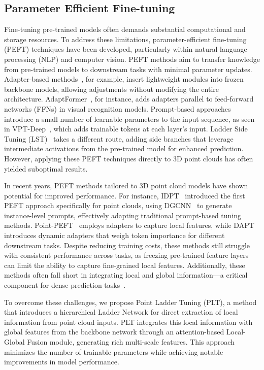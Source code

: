 \subsection{Parameter Efficient Fine-tuning}
Fine-tuning pre-trained models often demands substantial computational and storage resources. To address these limitations, parameter-efficient fine-tuning (PEFT) techniques have been developed, particularly within natural language processing (NLP) and computer vision. PEFT methods aim to transfer knowledge from pre-trained models to downstream tasks with minimal parameter updates. Adapter-based methods~\cite{houlsby2019parameter, hu2021lora, chen2022adaptformer}, for example, insert lightweight modules into frozen backbone models, allowing adjustments without modifying the entire architecture. AdaptFormer~\cite{chen2022adaptformer}, for instance, adds adapters parallel to feed-forward networks (FFNs) in visual recognition models. Prompt-based approaches~\cite{li2021prefix, jia2022visual} introduce a small number of learnable parameters to the input sequence, as seen in VPT-Deep~\cite{jia2022visual}, which adds trainable tokens at each layer’s input. Ladder Side Tuning (LST)~\cite{sung2022lst} takes a different route, adding side branches that leverage intermediate activations from the pre-trained model for enhanced prediction. However, applying these PEFT techniques directly to 3D point clouds has often yielded suboptimal results.

In recent years, PEFT methods tailored to 3D point cloud models have shown potential for improved performance. For instance, IDPT~\cite{zha2023instance} introduced the first PEFT approach specifically for point clouds, using DGCNN~\cite{wang2019dynamic} to generate instance-level prompts, effectively adapting traditional prompt-based tuning methods. Point-PEFT~\cite{tang2024point} employs adapters to capture local features, while DAPT~\cite{zhou2024dynamic} introduces dynamic adapters that weigh token importance for different downstream tasks. Despite reducing training costs, these methods still struggle with consistent performance across tasks, as freezing pre-trained feature layers can limit the ability to capture fine-grained local features. Additionally, these methods often fall short in integrating local and global information—a critical component for dense prediction tasks~\cite{chen2022vitadapter}.

To overcome these challenges, we propose Point Ladder Tuning (PLT), a method that introduces a hierarchical Ladder Network for direct extraction of local information from point cloud inputs. PLT integrates this local information with global features from the backbone network through an attention-based Local-Global Fusion module, generating rich multi-scale features. This approach minimizes the number of trainable parameters while achieving notable improvements in model performance.
